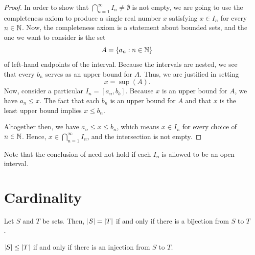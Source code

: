 \documentclass[11pt,twoside=off,numbers=noenddot]{scrbook}
\begin{document}
\begin{proof}
  In order to show that $\bigcap_{n = 1}^{\infty} I_n \neq \emptyset$
  is not empty, we are going to use the completeness axiom to produce
  a single real number $x$ satisfying $x \in I_n$ for every $n \in
  \mathbb N$. Now, the completeness axiom is a statement about bounded
  sets, and the one we want to consider is the set
  \[ A = \{ a_n : n \in \mathbb N \} \]
  of left-hand endpoints of the interval. Because the intervals are
  nested, we see that every $b_n$ serves as an upper bound for $A$.
  Thus, we are justified in setting
  \[ x = \sup(A). \]
  Now, consider a particular $I_n = [a_n, b_b]$. Because $x$ is an
  upper bound for $A$, we have $a_n \leq x$. The fact that each $b_n$
  is an upper bound for $A$ and that $x$ is the least upper bound
  implies $x \leq b_n$.

  Altogether then, we have $a_n \leq x \leq b_n$, which means $x \in
  I_n$ for every choice of $n \in \mathbb N$. Hence, $x \in \bigcap_{n =
  1}^{\infty} I_n$, and the intersection is not empty.
\end{proof}

\begin{remark}
  Note that the conclusion of  need
  not hold if each $I_n$ is allowed to be an open interval.
\end{remark}

\chapter{Cardinality}
\begin{definition}[Cardinality]
  Let $S$ and $T$ be sets. Then, $| S | = | T |$ if and only if
  there is a bijection from $S$ to $T$.
\end{definition}

\begin{definition}
  $| S | \leq | T |$ if and only if there is an injection from $S$ to $T$.
\end{definition}
\end{document}
